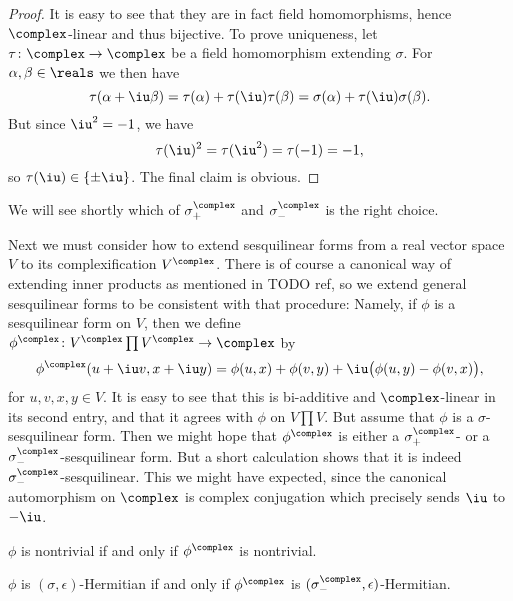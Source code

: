 \documentclass[a4paper, 11pt]{memoir}
\theoremstyle{plaincustomnumber}
\theoremstyle{changedotbreakcustomnumber}
\begin{document}
\begin{proof}
    It is easy to see that they are in fact field homomorphisms, hence $\complex$-linear and thus bijective. To prove uniqueness, let $\tau \colon \complex \to \complex$ be a field homomorphism extending $\sigma$. For $\alpha,\beta \in \reals$ we then have
    \begin{equation*}
        \tau(\alpha + \iu \beta)
            = \tau(\alpha) + \tau(\iu) \tau(\beta)
            = \sigma(\alpha) + \tau(\iu) \sigma(\beta).
    \end{equation*}
    But since $\iu^2 = -1$, we have
    \begin{equation*}
        \tau(\iu)^2
            = \tau(\iu^2)
            = \tau(-1)
            = -1,
    \end{equation*}
    so $\tau(\iu) \in \{\pm \iu\}$. The final claim is obvious.
\end{proof}
%
We will see shortly which of $\sigma^\complex_+$ and $\sigma^\complex_-$ is the right choice.

Next we must consider how to extend sesquilinear forms from a real vector space $V$ to its complexification $V^\complex$. There is of course a canonical way of extending inner products as mentioned in TODO ref, so we extend general sesquilinear forms to be consistent with that procedure: Namely, if $\phi$ is a sesquilinear form on $V$, then we define $\phi^\complex \colon V^\complex \prod V^\complex \to \complex$ by
%
\begin{equation*}
    \phi^\complex(u + \iu v, x + \iu y)
        = \phi(u,x) + \phi(v,y) + \iu \bigl( \phi(u,y) - \phi(v,x) \bigr),
\end{equation*}
%
for $u,v,x,y \in V$. It is easy to see that this is bi-additive and $\complex$-linear in its second entry, and that it agrees with $\phi$ on $V \prod V$. But assume that $\phi$ is a $\sigma$-sesquilinear form. Then we might hope that $\phi^\complex$ is either a $\sigma^\complex_+$- or a $\sigma^\complex_-$-sesquilinear form. But a short calculation shows that it is indeed $\sigma^\complex_-$-sesquilinear. This we might have expected, since the canonical automorphism on $\complex$ is complex conjugation which precisely sends $\iu$ to $-\iu$.

\begin{proposition}
    \begin{enumprop}
        \item $\phi$ is nontrivial if and only if $\phi^\complex$ is nontrivial.
        \item $\phi$ is $(\sigma,\epsilon)$-Hermitian if and only if $\phi^\complex$ is $(\sigma^\complex_-,\epsilon)$-Hermitian.
    \end{enumprop}
\end{proposition}
\end{document}
